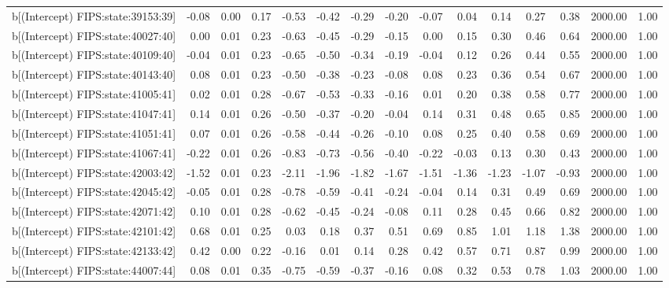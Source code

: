 \begin{table}[ht]
\begin{tabular}{rrrrrrrrrrrrrrr}
  b[(Intercept) FIPS:state:39153:39] & -0.08 & 0.00 & 0.17 & -0.53 & -0.42 & -0.29 & -0.20 & -0.07 & 0.04 & 0.14 & 0.27 & 0.38 & 2000.00 & 1.00 \\ 
  b[(Intercept) FIPS:state:40027:40] & 0.00 & 0.01 & 0.23 & -0.63 & -0.45 & -0.29 & -0.15 & 0.00 & 0.15 & 0.30 & 0.46 & 0.64 & 2000.00 & 1.00 \\ 
  b[(Intercept) FIPS:state:40109:40] & -0.04 & 0.01 & 0.23 & -0.65 & -0.50 & -0.34 & -0.19 & -0.04 & 0.12 & 0.26 & 0.44 & 0.55 & 2000.00 & 1.00 \\ 
  b[(Intercept) FIPS:state:40143:40] & 0.08 & 0.01 & 0.23 & -0.50 & -0.38 & -0.23 & -0.08 & 0.08 & 0.23 & 0.36 & 0.54 & 0.67 & 2000.00 & 1.00 \\ 
  b[(Intercept) FIPS:state:41005:41] & 0.02 & 0.01 & 0.28 & -0.67 & -0.53 & -0.33 & -0.16 & 0.01 & 0.20 & 0.38 & 0.58 & 0.77 & 2000.00 & 1.00 \\ 
  b[(Intercept) FIPS:state:41047:41] & 0.14 & 0.01 & 0.26 & -0.50 & -0.37 & -0.20 & -0.04 & 0.14 & 0.31 & 0.48 & 0.65 & 0.85 & 2000.00 & 1.00 \\ 
  b[(Intercept) FIPS:state:41051:41] & 0.07 & 0.01 & 0.26 & -0.58 & -0.44 & -0.26 & -0.10 & 0.08 & 0.25 & 0.40 & 0.58 & 0.69 & 2000.00 & 1.00 \\ 
  b[(Intercept) FIPS:state:41067:41] & -0.22 & 0.01 & 0.26 & -0.83 & -0.73 & -0.56 & -0.40 & -0.22 & -0.03 & 0.13 & 0.30 & 0.43 & 2000.00 & 1.00 \\ 
  b[(Intercept) FIPS:state:42003:42] & -1.52 & 0.01 & 0.23 & -2.11 & -1.96 & -1.82 & -1.67 & -1.51 & -1.36 & -1.23 & -1.07 & -0.93 & 2000.00 & 1.00 \\ 
  b[(Intercept) FIPS:state:42045:42] & -0.05 & 0.01 & 0.28 & -0.78 & -0.59 & -0.41 & -0.24 & -0.04 & 0.14 & 0.31 & 0.49 & 0.69 & 2000.00 & 1.00 \\ 
  b[(Intercept) FIPS:state:42071:42] & 0.10 & 0.01 & 0.28 & -0.62 & -0.45 & -0.24 & -0.08 & 0.11 & 0.28 & 0.45 & 0.66 & 0.82 & 2000.00 & 1.00 \\ 
  b[(Intercept) FIPS:state:42101:42] & 0.68 & 0.01 & 0.25 & 0.03 & 0.18 & 0.37 & 0.51 & 0.69 & 0.85 & 1.01 & 1.18 & 1.38 & 2000.00 & 1.00 \\ 
  b[(Intercept) FIPS:state:42133:42] & 0.42 & 0.00 & 0.22 & -0.16 & 0.01 & 0.14 & 0.28 & 0.42 & 0.57 & 0.71 & 0.87 & 0.99 & 2000.00 & 1.00 \\ 
  b[(Intercept) FIPS:state:44007:44] & 0.08 & 0.01 & 0.35 & -0.75 & -0.59 & -0.37 & -0.16 & 0.08 & 0.32 & 0.53 & 0.78 & 1.03 & 2000.00 & 1.00 \\ 

\end{tabular}
\end{table}
